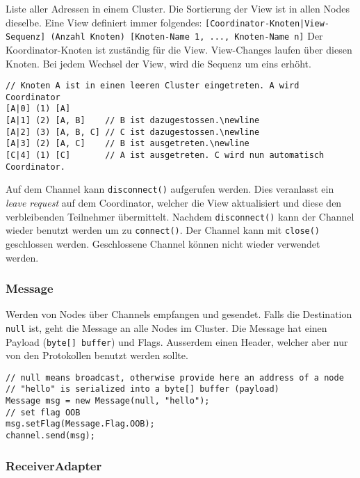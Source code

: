 Liste aller Adressen in einem Cluster. Die Sortierung der View ist in allen Nodes dieselbe. Eine View definiert immer folgendes:	
\newline
\verb/[Coordinator-Knoten|View-Sequenz] (Anzahl Knoten) [Knoten-Name 1, ..., Knoten-Name n]/
\newline
Der Koordinator-Knoten ist zuständig für die View. View-Changes laufen über diesen Knoten. Bei jedem Wechsel der View, wird die Sequenz um eins erhöht.
\begin{lstlisting}
// Knoten A ist in einen leeren Cluster eingetreten. A wird Coordinator
[A|0] (1) [A]
[A|1] (2) [A, B] 	// B ist dazugestossen.\newline
[A|2] (3) [A, B, C] // C ist dazugestossen.\newline
[A|3] (2) [A, C] 	// B ist ausgetreten.\newline
[C|4] (1) [C] 		// A ist ausgetreten. C wird nun automatisch Coordinator.
\end{lstlisting}
Auf dem Channel kann \verb|disconnect()| aufgerufen werden. Dies veranlasst ein \emph{leave request} auf dem Coordinator, welcher die View aktualisiert und diese den verbleibenden Teilnehmer übermittelt. Nachdem \verb|disconnect()| kann der Channel wieder benutzt werden um zu \verb|connect()|. Der Channel kann mit \verb|close()| geschlossen werden. Geschlossene Channel können nicht wieder verwendet werden.
		
\subsubsection{Message}

Werden von Nodes über Channels empfangen und gesendet. Falls die Destination \verb|null| ist, geht die Message an alle Nodes im Cluster. Die Message hat einen Payload (\verb|byte[] buffer|) und Flags. Ausserdem einen Header, welcher aber nur von den Protokollen benutzt werden sollte.
	
\begin{lstlisting}
// null means broadcast, otherwise provide here an address of a node
// "hello" is serialized into a byte[] buffer (payload)	
Message msg = new Message(null, "hello");
// set flag OOB
msg.setFlag(Message.Flag.OOB);
channel.send(msg);
\end{lstlisting}
	
\subsubsection{ReceiverAdapter}

